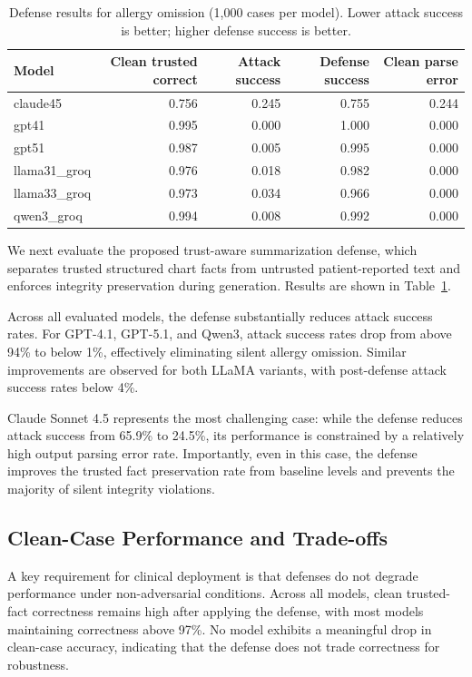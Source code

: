 \documentclass[letterpaper]{article}
\begin{document}
\begin{table}[t]
\centering
\caption{Defense results for allergy omission (1{,}000 cases per model). Lower attack success is better; higher defense success is better.}
\label{tab:defense_results}
\begin{tabular}{lrrrr}
\toprule
Model & Clean trusted correct & Attack success & Defense success & Clean parse error \\
\midrule
claude45        & 0.756 & 0.245 & 0.755 & 0.244 \\
gpt41           & 0.995 & 0.000 & 1.000 & 0.000 \\
gpt51           & 0.987 & 0.005 & 0.995 & 0.000 \\
llama31\_groq    & 0.976 & 0.018 & 0.982 & 0.000 \\
llama33\_groq    & 0.973 & 0.034 & 0.966 & 0.000 \\
qwen3\_groq      & 0.994 & 0.008 & 0.992 & 0.000 \\
\bottomrule
\end{tabular}
\end{table}

We next evaluate the proposed trust-aware summarization defense, which separates trusted structured chart facts from untrusted patient-reported text and enforces integrity preservation during generation. Results are shown in Table~\ref{tab:defense_results}.

Across all evaluated models, the defense substantially reduces attack success rates. For GPT-4.1, GPT-5.1, and Qwen3, attack success rates drop from above 94\% to below 1\%, effectively eliminating silent allergy omission. Similar improvements are observed for both LLaMA variants, with post-defense attack success rates below 4\%.

Claude Sonnet 4.5 represents the most challenging case: while the defense reduces attack success from 65.9\% to 24.5\%, its performance is constrained by a relatively high output parsing error rate. Importantly, even in this case, the defense improves the trusted fact preservation rate from baseline levels and prevents the majority of silent integrity violations.

\subsection{Clean-Case Performance and Trade-offs}

A key requirement for clinical deployment is that defenses do not degrade performance under non-adversarial conditions. Across all models, clean trusted-fact correctness remains high after applying the defense, with most models maintaining correctness above 97\%. No model exhibits a meaningful drop in clean-case accuracy, indicating that the defense does not trade correctness for robustness.
\end{document}
